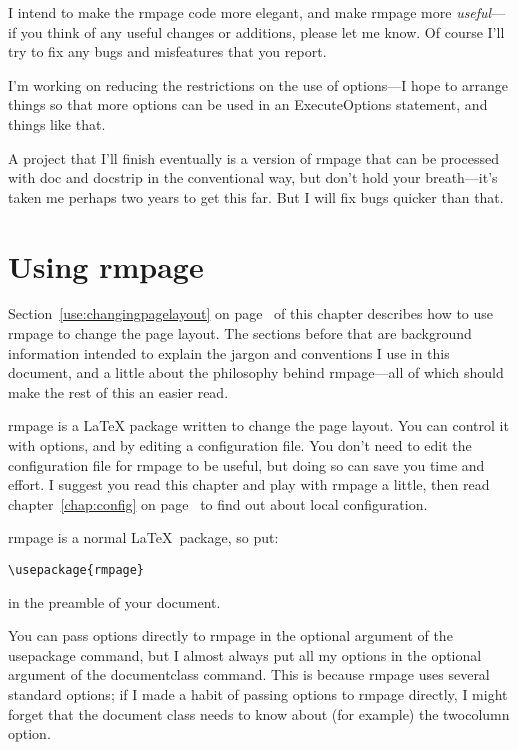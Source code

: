 \documentclass[11pt,loose,twoside,touchwider,longish,
                      noheaders,a4paper,notstdmargins]{report}
\newcommand*{\packname}[1]{{\sffamily #1}}
\DeclareRobustCommand*{\comname}[1]{{\ttfamily\makeatletter\bs #1\makeatother}}
\newcommand*{\classname}[1]{{\ttfamily #1}}
\newcommand*{\optname}[1]{{\ttfamily #1}}
\newcommand*{\rmpage}{\classname{rmpage}\xspace}
\begin{document}
I intend to make the \rmpage code more elegant, and make \rmpage more
\emph{useful}---if you think of any useful changes or additions,
please let me know.  Of course I'll try to fix any bugs and
misfeatures that you report.

I'm working on reducing the restrictions on the use of options---I
hope to arrange things so that more options can be used in an
\comname{ExecuteOptions} statement, and things like that.

A project that I'll finish eventually is a version of \rmpage that can
be processed with \packname{doc} and \packname{docstrip} in the
conventional way, but don't hold your breath---it's taken me perhaps
two years to get this far.  But I will fix bugs quicker than that.

\chapter{Using \rmpage}
\label{chap:use}

Section~\ref{use:changingpagelayout} on
page~\pageref{use:changingpagelayout} of this chapter describes how to
use \rmpage to change the page layout.  The sections before that are
background information intended to explain the jargon and conventions
I use in this document, and a little about the philosophy behind
\rmpage---all of which should make the rest of this an easier read.

\rmpage is a \LaTeX{} package written to change the page layout.  You
can control it with options, and by editing a configuration file.
You don't need to edit the configuration file for \rmpage to be
useful, but doing so can save you time and effort.  I suggest you read
this chapter and play with \rmpage a little, then read
chapter~\ref{chap:config} on page~\pageref{chap:config} to find out
about local configuration.

\rmpage is a normal \LaTeX\ package, so put:
\begin{verbatim}
\usepackage{rmpage}
\end{verbatim}
in the preamble of your document.

You can pass options directly to \rmpage in the optional argument of
the \comname{usepackage} command, but I almost always put all my
options in the optional argument of the \comname{documentclass}
command.  This is because \rmpage uses several standard options; if I
made a habit of passing options to \rmpage directly, I might forget
that the document class needs to know about (for example) the
\optname{twocolumn} option.
\end{document}
